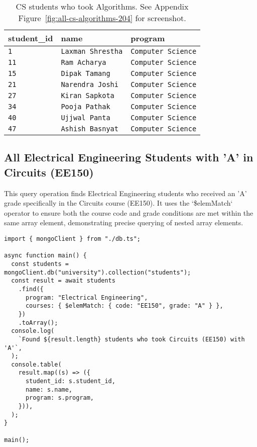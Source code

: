 \begin{table}[H]
  \centering
  \begin{tabular}{|l|l|l|}
    \hline
    \textbf{student\_id} & \textbf{name} & \textbf{program} \\
    \hline
    \texttt{1} & \texttt{Laxman Shrestha} & \texttt{Computer Science} \\
    \texttt{11} & \texttt{Ram Acharya} & \texttt{Computer Science} \\
    \texttt{15} & \texttt{Dipak Tamang} & \texttt{Computer Science} \\
    \texttt{21} & \texttt{Narendra Joshi} & \texttt{Computer Science} \\
    \texttt{27} & \texttt{Kiran Sapkota} & \texttt{Computer Science} \\
    \texttt{34} & \texttt{Pooja Pathak} & \texttt{Computer Science} \\
    \texttt{40} & \texttt{Ujjwal Panta} & \texttt{Computer Science} \\
    \texttt{47} & \texttt{Ashish Basnyat} & \texttt{Computer Science} \\
    \hline
  \end{tabular}
  \caption{CS students who took Algorithms. See Appendix Figure~\ref{fig:all-cs-algorithms-204} for screenshot.}
\end{table}

\subsection{All Electrical Engineering Students with 'A' in Circuits (EE150)}
This query operation finds Electrical Engineering students who received an 'A' grade specifically in the Circuits course (EE150). It uses the `\$elemMatch` operator to ensure both the course code and grade conditions are met within the same array element, demonstrating precise querying of nested array elements.

\begin{verbatim}
import { mongoClient } from "./db.ts";

async function main() {
  const students = mongoClient.db("university").collection("students");
  const result = await students
    .find({
      program: "Electrical Engineering",
      courses: { $elemMatch: { code: "EE150", grade: "A" } },
    })
    .toArray();
  console.log(
    `Found ${result.length} students who took Circuits (EE150) with 'A'`,
  );
  console.table(
    result.map((s) => ({
      student_id: s.student_id,
      name: s.name,
      program: s.program,
    })),
  );
}

main();
\end{verbatim}

